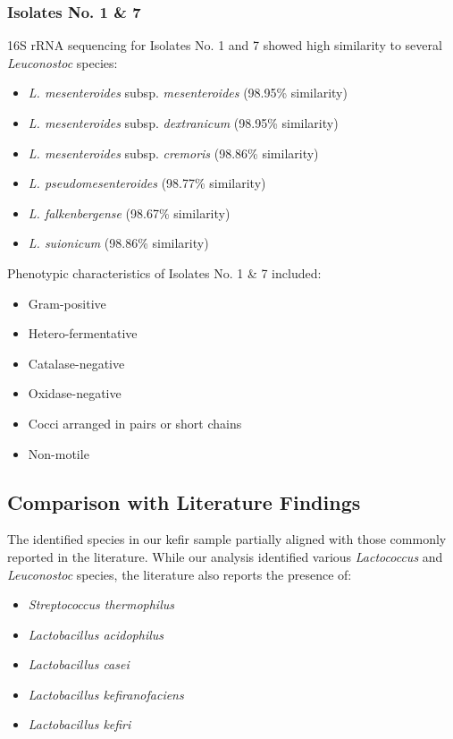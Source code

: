 \subsubsection{Isolates No. 1 \& 7}
16S rRNA sequencing for Isolates No. 1 and 7 showed high similarity to several \textit{Leuconostoc} species:

\begin{itemize}
    \item \textit{L. mesenteroides} subsp. \textit{mesenteroides} (98.95\% similarity)
    \item \textit{L. mesenteroides} subsp. \textit{dextranicum} (98.95\% similarity)
    \item \textit{L. mesenteroides} subsp. \textit{cremoris} (98.86\% similarity)
    \item \textit{L. pseudomesenteroides} (98.77\% similarity)
    \item \textit{L. falkenbergense} (98.67\% similarity)
    \item \textit{L. suionicum} (98.86\% similarity)
\end{itemize}

\vspace{0.5em}
Phenotypic characteristics of Isolates No. 1 \& 7 included:

\begin{itemize}
    \item Gram-positive
    \item Hetero-fermentative
    \item Catalase-negative
    \item Oxidase-negative
    \item Cocci arranged in pairs or short chains
    \item Non-motile
\end{itemize}

\subsection{Comparison with Literature Findings}
The identified species in our kefir sample partially aligned with those commonly reported in the literature. While our analysis identified various \textit{Lactococcus} and \textit{Leuconostoc} species, the literature also reports the presence of:
\begin{itemize}
    \item \textit{Streptococcus thermophilus}
    \item \textit{Lactobacillus acidophilus}
    \item \textit{Lactobacillus casei}
    \item \textit{Lactobacillus kefiranofaciens}
    \item \textit{Lactobacillus kefiri}
\end{itemize}
